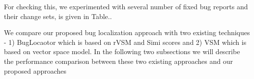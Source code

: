 \documentclass{sig-alternate}
\begin{document}
For checking this, we experimented with several number of fixed bug reports and their change sets, is given in Table..
%
%
%

We compare our proposed bug localization approach with two existing techniques - 1) BugLocaotor which is based on rVSM and Simi scores and 2) VSM which is based on vector space model. In the following two subsections we will describe the performance comparison between these two existing approaches and our proposed approaches
\end{document}
